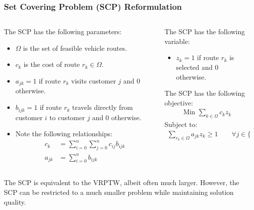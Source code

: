 \documentclass{beamer}
\begin{document}
	\begin{frame}[t]
		\frametitle{Set Covering Problem (SCP) Reformulation}
		\footnotesize
		\begin{columns}[T]
			\begin{column}{0.55\textwidth}
				The SCP has the following parameters:
				\begin{itemize}
					\item $\Omega$ is the set of feasible vehicle routes.
					\item $c_k$ is the cost of route $r_k \in \Omega$.
					\item $a_{jk} = 1$ if route $r_k$ visits customer $j$ and 0 otherwise.
					\item $b_{ijk} = 1$ if route $r_k$ travels directly from customer $i$ to customer $j$ and 0 otherwise.
					\item Note the following relationships:
					\begin{align*}
						c_k &= \sum_{i=0}^n \sum_{j=0}^n c_{ij}b_{ijk} \\
						a_{jk} &= \sum_{i=0}^n b_{ijk}
					\end{align*}
				\end{itemize}
			\end{column}
			\begin{column}{0.45\textwidth}
				The SCP has the following variable:
				\begin{itemize}
					\item $z_k = 1$ if route $r_k$ is selected and 0 otherwise.
				\end{itemize}
				The SCP has the following objective:
				\begin{align*}
					\text{Min } \sum_{k \in \Omega}c_k z_k
				\end{align*}
				Subject to:
				\begin{align}
					\sum_{r_k \in \Omega} a_{jk} z_k \geq 1 \qquad \forall j \in \{1,...,n\} \label{c:set_covering}
				\end{align}
			\end{column}
		\end{columns}
		\vspace{0cm}
		\begin{block}{}
			The SCP is equivalent to the VRPTW, albeit often much larger. However, the SCP can be restricted to a much smaller problem while maintaining solution quality.
		\end{block}
		\normalsize
	\end{frame}
\end{document}

